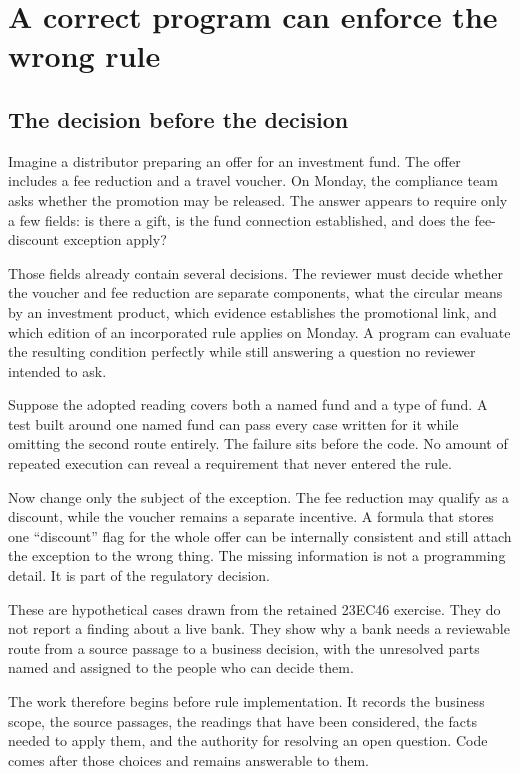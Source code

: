 \documentclass[12pt,a4paper,oneside,openany]{book}
\begin{document}
\chapter{A correct program can enforce the wrong rule}
\label{ch:problem}

\section{The decision before the decision}
\label{merge:M01:00}

\label{sec:problem-decision}
Imagine a distributor preparing an offer for an investment fund. The offer
includes a fee reduction and a travel voucher. On Monday, the compliance team
asks whether the promotion may be released. The answer appears to require only a
few fields: is there a gift, is the fund connection established, and does the
fee-discount exception apply?

Those fields already contain several decisions. The reviewer must decide whether
the voucher and fee reduction are separate components, what the circular means by
an investment product, which evidence establishes the promotional link, and
which edition of an incorporated rule applies on Monday. A program can evaluate
the resulting condition perfectly while still answering a question no reviewer
intended to ask.

Suppose the adopted reading covers both a named fund and a type of fund. A test
built around one named fund can pass every case written for it while omitting the
second route entirely. The failure sits before the code. No amount of repeated
execution can reveal a requirement that never entered the rule.

Now change only the subject of the exception. The fee reduction may qualify as a
discount, while the voucher remains a separate incentive. A formula that stores
one ``discount'' flag for the whole offer can be internally consistent and still
attach the exception to the wrong thing. The missing information is not a
programming detail. It is part of the regulatory decision.

These are hypothetical cases drawn from the retained 23EC46 exercise. They do
not report a finding about a live bank. They show why a bank needs a reviewable
route from a source passage to a business decision, with the unresolved parts
named and assigned to the people who can decide them.

The work therefore begins before rule implementation. It records the business
scope, the source passages, the readings that have been considered, the facts
needed to apply them, and the authority for resolving an open question. Code
comes after those choices and remains answerable to them.
\end{document}
